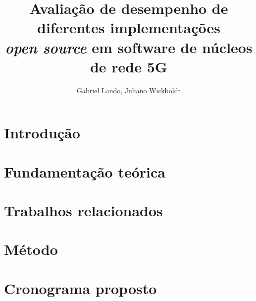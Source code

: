 \documentclass[12pt]{article}
\title{Avaliação de desempenho de diferentes implementações \\
\textit{open source} em software de núcleos de rede 5G}
\author{Gabriel Lando\inst{1}, Juliano Wickboldt\inst{1}}
\begin{document}
 

\maketitle

\begin{abstract}

\end{abstract}
     
\begin{resumo} 

\end{resumo}

\section{Introdução}
\label{sec:intro}


\section{Fundamentação teórica}
\label{sec:background}


\section{Trabalhos relacionados}
\label{sec:related}


\section{Método}
\label{sec:method}


\section{Cronograma proposto}
\label{sec:schedule}





\end{document}
